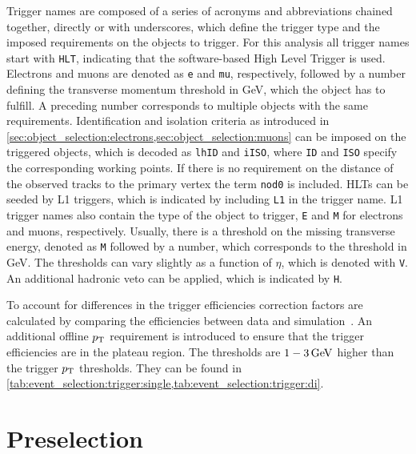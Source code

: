 Trigger names are composed of a series of acronyms and abbreviations chained together, directly or with underscores,
which define the trigger type and the imposed requirements on the objects to trigger.
For this analysis all trigger names start with \texttt{HLT}, indicating that the software-based High Level Trigger
is used.
Electrons and muons are denoted  as \texttt{e} and \texttt{mu}, respectively, followed by a number defining the transverse
momentum threshold in GeV, which the object has to fulfill.
A preceding number corresponds to multiple objects with the same requirements.
Identification and isolation criteria as introduced in \cref{sec:object_selection:electrons,sec:object_selection:muons}
can be imposed on the triggered objects, which is decoded as \texttt{lhID}
and \texttt{iISO}, where \texttt{ID} and \texttt{ISO} specify the corresponding working points.
If there is no requirement on the distance of the observed tracks to the primary vertex the term \texttt{nod0}
is included.
HLTs can be seeded by L1 triggers, which is indicated by including \texttt{L1} in the trigger name.
L1 trigger names also contain the type of the object to trigger, \texttt{E} and \texttt{M} for electrons and muons, respectively.
Usually, there is a threshold on the missing transverse energy, denoted as \texttt{M} followed by a number,
which corresponds to the threshold in GeV.
The \etmiss{} thresholds can vary slightly as a function of $\eta$, which is denoted with \texttt{V}.
An additional hadronic veto can be applied, which is indicated by \texttt{H}.

To account for differences in the trigger efficiencies correction factors are calculated by comparing
the efficiencies between data and simulation~\cite{Trigger2015,Trigger2016}.
An additional offline $p_\text{T}$ requirement is introduced to ensure that the trigger efficiencies are in the plateau region.
The thresholds are $\unit[1-3]{GeV}$ higher than the trigger $p_\text{T}$ thresholds.
They can be found in \cref{tab:event_selection:trigger:single,tab:event_selection:trigger:di}.

\section{Preselection}\label{sec:event_selection:preselection}

